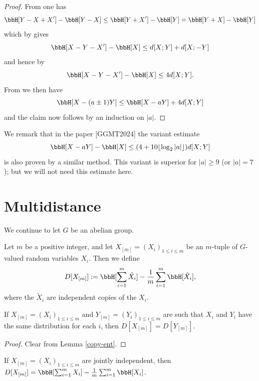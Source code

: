 \begin{proof}\leanok From  one has
  $$\bbH[Y-X+X'] - \bbH[Y-X] \leq \bbH[Y+X'] - \bbH[Y] = \bbH[Y+X] - \bbH[Y]$$
  which by  gives
  $$\bbH[X-Y-X'] -\bbH[X] \leq d[X;Y] + d[X;-Y]$$
  and hence by 
  $$\bbH[X-Y-X'] - \bbH[X] \leq 4d[X;Y].$$
  From  we then have
  $$\bbH[X-(a\pm 1)Y] \leq \bbH[X-aY] + 4 d[X;Y]$$
and the claim now follows by an induction on $|a|$.
\end{proof}

We remark that in the paper [GGMT2024] the variant estimate
$$\bbH[X-aY] - \bbH[X] \leq (4 + 10 \lfloor \log_2 |a| \rfloor) d[X;Y]$$
is also proven by a similar method.  This variant is superior for $|a| \geq 9$ (or $|a|=7$); but we will not need this estimate here.



\section{Multidistance}

We continue to let $G$ be an abelian group.

\begin{definition}[Multidistance]\label{multidist-def}\leanok  Let $m$ be a positive integer, and let $X_{[m]} = (X_i)_{1 \leq i \leq m}$ be an $m$-tuple of $G$-valued random variables $X_i$. Then we define
\[
  D[X_{[m]}] := \bbH[\sum_{i=1}^m \tilde X_i] - \frac{1}{m} \sum_{i=1}^m \bbH[\tilde X_i],
\]
where the $\tilde X_i$ are independent copies of the $X_i$.
\end{definition}

\begin{lemma}\label{multidist-copy}\leanok  If $X_{[m]} = (X_i)_{1 \leq i \leq m}$ and $Y_{[m]} = (Y_i)_{1 \leq i \leq m}$ are such that $X_i$ and $Y_i$ have the same distribution for each $i$, then $D[X_{[m]}] = D[Y_{[m]}]$.
\end{lemma}

\begin{proof}\leanok Clear from Lemma \ref{copy-ent}.
\end{proof}

\begin{lemma}\label{multidist-indep}\leanok  If $X_{[m]} = (X_i)_{1 \leq i \leq m}$ are jointly independent, then $D[X_{[m]}] = \bbH[\sum_{i=1}^m X_i] - \frac{1}{m} \sum_{i=1}^m \bbH[X_i]$.
\end{lemma}

